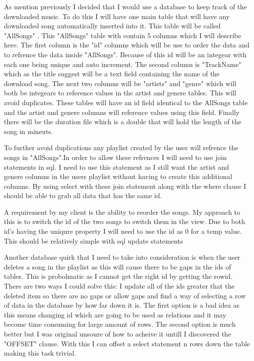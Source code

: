 \documentclass{article}
\begin{document}
As mention previously I decided that I would use a database to keep track of the
downloaded music. To do this I will have one main table that will have any
downloaded song automatically inserted into it. This table will be called "AllSongs"
. This "AllSongs" table with contain 5 columns which I will describe here.
The first column is the "id" columns which will be use to order the data
and to refrence the data inside "AllSongs". Because of this id will be an
integear with each one being unique and auto increment. The second column
is "TrackName" which as the title suggest will be a text field containing
the name of the download song. The next two columns will be "artists" and
"genre" which will both be integears to reference values in the artist and
genere tables. This will avoid duplicates. These tables will have an id field
identical to the AllSongs table and the artist and genere columns will
reference values using this field. Finally there will be the duration
file which is a double that will hold the length of the song in mineuts.

To further avoid duplications any playlist created by the user will refrence
the songs in "AllSongs".In order to allow these refrences I will need to use join
statements in sql. I need to use this statement as I still want the artist and
genere columns in the users playlist without having to create this additional columns.
By using select with these join statement along with the where clause I should
be able to grab all data that has the same id.

A requirement by my client is the ability to reorder the songs. My approach
to this is to switch the id of the two songs to switch them in the view.
Due to both id's having the uniqure property I will need to use the id as
0 for a temp value. This should be relatively simple with sql update statements

Another database quirk that I need to take into consideration is when the user
deletes a song in the playlist as this will cause there to be gaps in the
ids of tables. This is probolmatic as I cannot get the right id by getting
the rowid. There are two ways I could solve this: I update all of the ids
greater that the deleted item so there are no gaps or allow gaps and find
a way of selecting a row of data in the database by how far down it is.
The first option is a bad idea as this means changing id which are going
to be used as relations and it may become time consuming for large
amount of rows. The second option is much better but I was original unsoure
of how to acheive it untill I discovered the "OFFSET" clause. With this
I can offset a select statement n rows down the table making this task
trivial.
\end{document}
